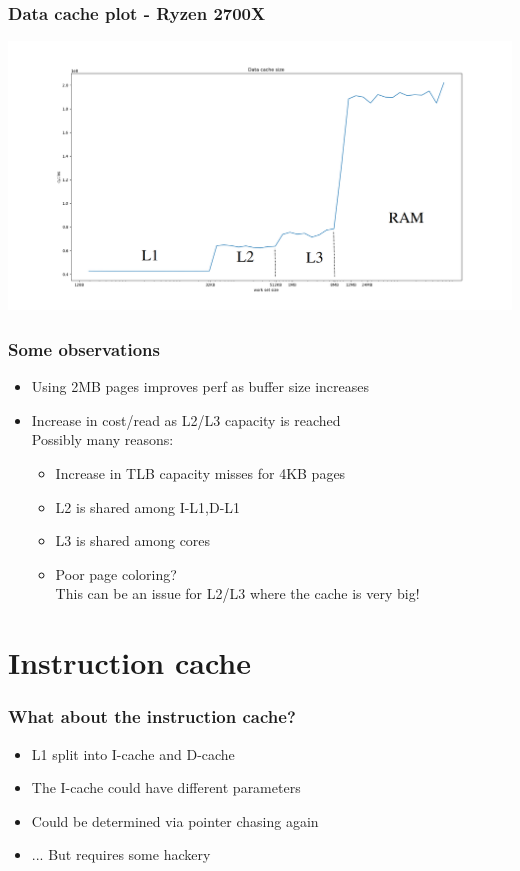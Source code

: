 \documentclass{beamer}
\begin{document}
\begin{frame}
\frametitle{Data cache plot - Ryzen 2700X}
\centerline{\includegraphics[scale=.23]{img/data_size_zen.png}}
\end{frame}

\begin{frame}
\frametitle{Some observations}
\begin{itemize}
\item Using 2MB pages improves perf as buffer size increases\\
\item Increase in cost/read as L2/L3 capacity is reached\\
Possibly many reasons:\\
\begin{itemize}
\item Increase in TLB capacity misses for 4KB pages
\item L2 is shared among I-L1,D-L1
\item L3 is shared among cores
\item Poor page coloring?\\
This can be an issue for L2/L3 where the cache is very big!
\end{itemize}
\end{itemize}
\end{frame}

\section{Instruction cache}

\begin{frame}
\frametitle{What about the instruction cache?}
\begin{itemize}
\item L1 split into I-cache and D-cache 
\item The I-cache could have different parameters
\item Could be determined via pointer chasing again
\item ... But requires some hackery
\end{itemize}
\end{frame}
\end{document}
